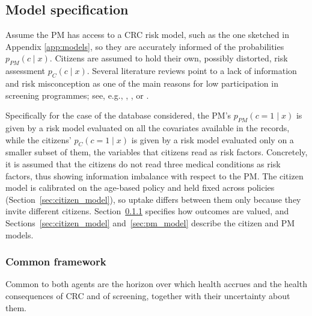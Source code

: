\documentclass[12pt]{article}
\begin{document}
\subsection{Model specification} \label{sec:public_scheme_modelling}
Assume the PM has access to a CRC risk model, such as the one sketched in Appendix \ref{app:models}, so they are accurately informed of the probabilities $p_{PM}(c \mid x)$. Citizens are assumed to hold their own, possibly distorted, risk assessment $p_C(c \mid x)$. Several literature reviews point to a lack of information and risk misconception as one of the main reasons for low participation in screening programmes; see, e.g., \cite{wee2005factors}, \cite{le2023exploring}, or \cite{berg2022reasons}. 
 
Specifically for the case of the database considered, the PM's $p_{PM}(c=1 \mid x)$ is given by a risk model evaluated on all the covariates available in the records, while the citizens' $p_{C}(c=1 \mid x)$ is given by a risk model evaluated only on a smaller subset of them, the variables that citizens read as risk factors. Concretely, it is assumed that the citizens do not read three medical conditions as risk factors, thus showing information imbalance with respect to the PM. The citizen model is calibrated on the age-based policy and held fixed across policies (Section~\ref{sec:citizen_model}), so uptake differs between them only because they invite different citizens. Section~\ref{sec:common_framework} specifies how outcomes are valued, and Sections~\ref{sec:citizen_model} and~\ref{sec:pm_model} describe the citizen and PM models. 

\subsubsection{Common framework}\label{sec:common_framework}
Common to both agents are the horizon over which health accrues and the health consequences of CRC and of screening, together with their uncertainty about them. 
\end{document}
